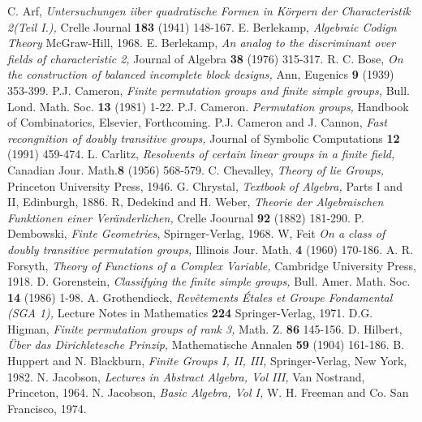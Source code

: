 \begin{thebibliography}{99}
 C. Arf, \textit{Untersuchungen iiber quadratische Formen in K\"orpern der Characteristik 2(Teil I.),} Crelle Journal {\bf 183} (1941) 148-167. 
 E. Berlekamp, \textit{Algebraic Codign Theory} McGraw-Hill, 1968.
 E. Berlekamp, \textit{An analog to the discriminant over fields of characteristic 2,} Journal of Algebra {\bf 38} (1976) 315-317.
 R. C. Bose, \textit{On the construction of balanced incomplete block designs,} Ann, Eugenics {\bf 9} (1939) 353-399.
 P.J. Cameron, \textit{Finite permutation groups and finite simple groups,} Bull. Lond. Math. Soc. {\bf 13} (1981) 1-22.
 P.J. Cameron. \textit{Permutation groups,} Handbook of Combinatorics, Elsevier, Forthcoming.
 P.J. Cameron and J. Cannon, \textit{Fast recongnition of doubly transitive groups,} Journal of Symbolic Computations {\bf 12} (1991) 459-474.
 L. Carlitz, \textit{Resolvents of certain linear groups in a finite field,} Canadian Jour. Math.{\bf 8} (1956) 568-579.
 C. Chevalley, \textit{Theory of lie Groups,} Princeton University Press, 1946.  
 G. Chrystal, \textit{Textbook of Algebra,} Parts I and II, Edinburgh, 1886.
 R, Dedekind and H. Weber, \textit{Theorie der Algebraischen Funktionen einer Ver\"anderlichen,} Crelle Joournal {\bf 92} (1882) 181-290.
 P. Dembowski, \textit{Finte Geometries}, Spirnger-Verlag, 1968.
 W, Feit \textit{On a class of doubly transitive permutation groups,} Illinois Jour. Math. {\bf 4} (1960) 170-186.
 A. R. Forsyth, \textit{Theory of Functions of a Complex Variable,} Cambridge University Press, 1918.
 D. Gorenstein, \textit{Classifying the finite simple groups,} Bull. Amer. Math. Soc. {\bf 14} (1986) 1-98.
 A. Grothendieck, \textit{Rev\^etements \'Etales et Groupe Fondamental (SGA 1),} Lecture Notes in Mathematics {\bf 224} Springer-Verlag, 1971.
 D.G. Higman, \textit{Finite permutation groups of rank 3,} Math. Z. {\bf 86} 145-156.
 D. Hilbert, \textit{\"Uber das Dirichletesche Prinzip,} Mathematische Annalen {\bf 59} (1904) 161-186.
 B. Huppert and N. Blackburn, \textit{Finite Groups I, II, III,} Springer-Verlag, New York, 1982.
 N. Jacobson, \textit{Lectures in Abstract Algebra, Vol III,} Van Nostrand, Princeton, 1964.
 N. Jacobson, \textit{Basic Algebra, Vol I,} W. H. Freeman and Co. San Francisco, 1974.

\end{thebibliography}
